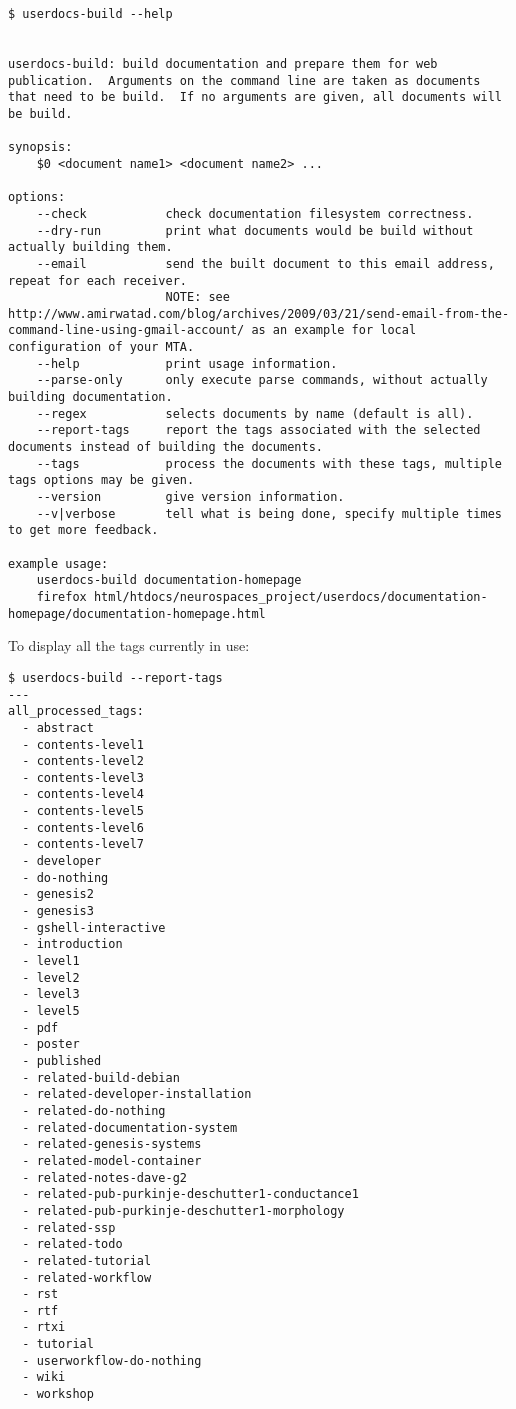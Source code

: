 \documentclass[12pt]{article}
\begin{document}
\begin{verbatim}
$ userdocs-build --help


userdocs-build: build documentation and prepare them for web
publication.  Arguments on the command line are taken as documents
that need to be build.  If no arguments are given, all documents will
be build.

synopsis:
    $0 <document name1> <document name2> ...

options:
    --check           check documentation filesystem correctness.
    --dry-run         print what documents would be build without actually building them.
    --email           send the built document to this email address, repeat for each receiver.
                      NOTE: see http://www.amirwatad.com/blog/archives/2009/03/21/send-email-from-the-command-line-using-gmail-account/ as an example for local configuration of your MTA.
    --help            print usage information.
    --parse-only      only execute parse commands, without actually building documentation.
    --regex           selects documents by name (default is all).
    --report-tags     report the tags associated with the selected documents instead of building the documents.
    --tags            process the documents with these tags, multiple tags options may be given.
    --version         give version information.
    --v|verbose       tell what is being done, specify multiple times to get more feedback.

example usage:
    userdocs-build documentation-homepage
    firefox html/htdocs/neurospaces_project/userdocs/documentation-homepage/documentation-homepage.html

\end{verbatim}

To display all the tags currently in use:

\begin{verbatim}
$ userdocs-build --report-tags
---
all_processed_tags:
  - abstract
  - contents-level1
  - contents-level2
  - contents-level3
  - contents-level4
  - contents-level5
  - contents-level6
  - contents-level7
  - developer
  - do-nothing
  - genesis2
  - genesis3
  - gshell-interactive
  - introduction
  - level1
  - level2
  - level3
  - level5
  - pdf
  - poster
  - published
  - related-build-debian
  - related-developer-installation
  - related-do-nothing
  - related-documentation-system
  - related-genesis-systems
  - related-model-container
  - related-notes-dave-g2
  - related-pub-purkinje-deschutter1-conductance1
  - related-pub-purkinje-deschutter1-morphology
  - related-ssp
  - related-todo
  - related-tutorial
  - related-workflow
  - rst
  - rtf
  - rtxi
  - tutorial
  - userworkflow-do-nothing
  - wiki
  - workshop
\end{verbatim}
\end{document}
